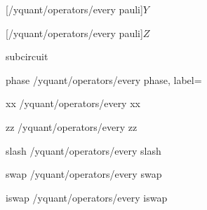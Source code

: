 [/yquant/operators/every pauli]{$Y$}

[/yquant/operators/every pauli]{$Z$}

\yquant@langhelper@declare@command%
   {subcircuit}%
   \yquant@register@get@multiaslist%
   {%
      \let\yquant@circuit@subcircuit@content=\yquant@lang@attr@value%
   }

\yquant@langhelper@declare@command%
   {phase}%
   {}%
   {%
      \edef\cmd{%
         \yquant@prepare%
            {}%
            {/yquant/operators/every phase, label={\unexpanded\expandafter{\yquant@lang@attr@value}}}%
      }%
      \cmd%
   }
%

\yquant@langhelper@declare@command%
   {xx}%
   \yquant@register@get@multiassingle%
   {%
      \yquant@prepare%
         {}%
         {/yquant/operators/every xx}%
   }

\yquant@langhelper@declare@command@uncontrolled%
   {zz}%
   \yquant@register@get@multiassingle%
   {%
      \yquant@prepare%
         {}%
         {/yquant/operators/every zz}%
   }

\yquant@langhelper@declare@command@uncontrolled%
   {slash}%
   {}%
   {%
      \preto{}%
      \yquant@prepare%
         {}%
         {/yquant/operators/every slash}%
   }

\yquant@langhelper@declare@command%
   {swap}%
   \yquant@register@get@multiassingle
   {%
      \yquant@prepare%
         {}%
         {/yquant/operators/every swap}%
   }

\yquant@langhelper@declare@command%
   {iswap}%
   \yquant@register@get@multiassingle
   {%
      \yquant@prepare%
         {}%
         {/yquant/operators/every iswap}%
   }

